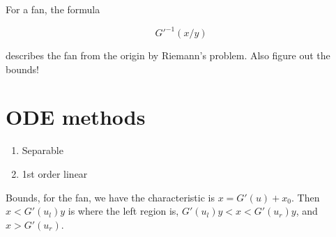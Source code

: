 \documentclass{article}
\newtheorem{one minute paper}[theorem]{One Minute Paper}
\begin{document}
For a fan, the formula 

\begin{equation}
    G'^{-1}(x/y)
\end{equation}

describes the fan from the origin by Riemann's problem. Also figure out the bounds! 

\section*{ODE methods}

\begin{enumerate}
    \item Separable
    \item 1st order linear
\end{enumerate}

Bounds, for the fan, we have the characteristic is $x = G'(u) + x_0$. Then $x < G'(u_l)y$ is where the left region is, $G'(u_l)y < x < G'(u_r)y$, and $x > G'(u_r)$. 
\end{document}
